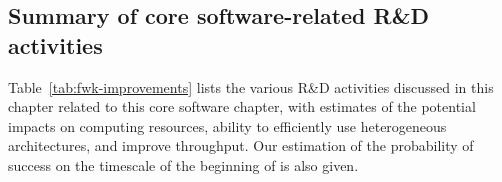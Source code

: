 \subsection{Summary of core software-related R\&D activities} 

Table~\ref{tab:fwk-improvements} lists the various R\&D activities discussed in this chapter related to this core software chapter, with estimates of the potential impacts on computing resources, ability to efficiently use heterogeneous architectures, and improve throughput. Our estimation of the probability of success on the timescale of the beginning of \RunFour is also given. 

